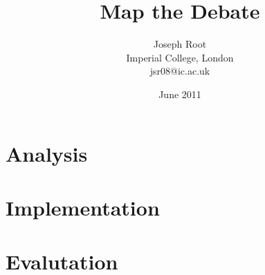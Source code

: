 \documentclass[a4paper,12pt]{report}
\author{Joseph Root\\
Imperial College, London\\
jsr08@ic.ac.uk}
\date{June 2011}
\title{Map the Debate}
\begin{document}
	
	

	
	
	
	
	\tableofcontents
	
	\part{Analysis}
	
	
	
	


	\part{Implementation}

	

	
	
	
	
	
	
	
	
	
	
	\part{Evalutation}
	
	
	
\end{document}
